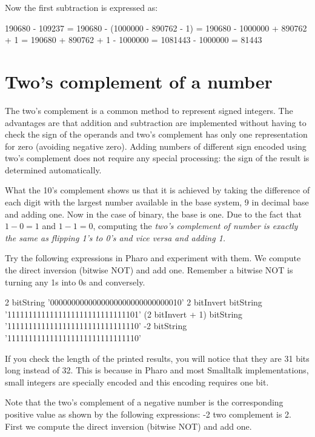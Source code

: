 \documentclass[a4paper,10pt,twoside]{book}
\begin{document}
Now the first subtraction is expressed as:
\begin{code}{}
190680 - 109237
= 190680 - (1000000 - 890762 - 1)
= 190680 - 1000000 + 890762 + 1
= 190680  + 890762 + 1 - 1000000
= 1081443 - 1000000
= 81443
\end{code}


\section{Two's complement of a number}

The two's complement is a common method to represent signed integers. The advantages are that addition and subtraction are implemented without having to  check the sign of the operands and two's complement has only one representation for zero (avoiding negative zero). Adding numbers of different sign encoded using two's complement does not  require any special processing: the sign of the result is determined automatically. 

What the 10's complement shows us  that it is achieved by taking the difference of each digit with the largest number available in the base system, 9 in decimal base and adding one. Now in the case of binary, the base is one.
Due to the fact that $1 - 0 = 1$ and $1 - 1 = 0$, computing the \emph{two's complement of number is exactly the same as flipping 1's to 0's and vice versa and adding 1.}


Try the following expressions in Pharo and experiment with them. We compute the direct inversion (bitwise NOT) and add one. 
Remember a bitwise NOT is turning any 1s into 0s and conversely. 

\begin{code}{}
2 bitString 
			'0000000000000000000000000000010'
2 bitInvert bitString 
			'1111111111111111111111111111101'
(2 bitInvert + 1) bitString 
			'1111111111111111111111111111110'
-2 bitString 
			'1111111111111111111111111111110'		 
\end{code}

If you check the length of the printed results, you will notice that they are 31 bits long instead of 32. This is because in Pharo and most Smalltalk implementations, small integers are specially encoded and this encoding requires one bit.

Note that the two's complement of a negative number is the corresponding positive value as shown by the following expressions: -2 two complement is 2. First we compute the direct inversion (bitwise NOT) and add one. 
\end{document}
